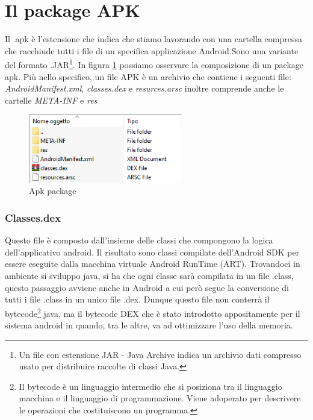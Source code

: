 \section{Il package APK}
\label{sub:apk}
Il .apk è l'estensione che indica che stiamo lavorando con una cartella compressa che racchiude tutti i file di un specifica applicazione Android.Sono una variante del formato .JAR\footnote{Un file con estensione JAR - Java Archive indica un archivio dati compresso usato per distribuire raccolte di classi Java.}. In figura \ref{fig:apkPack} possiamo osservare la composizione di un package apk. Più nello specifico, un file APK è un archivio che contiene i seguenti file: 
\textit{AndroidManifest.xml}, \textit{classes.dex} e \textit{resurces.arsc} inoltre comprende anche le cartelle \textit{META-INF} e \textit{res}
        \begin{figure}[h]
        \centering
        \includegraphics[width=0.6\textwidth]{imgs/capitolo2/Applicazioni/apk ins.png}
        \caption{Apk package}
        \label{fig:apkPack}
        \end{figure}
    \FloatBarrier %
\subsubsection{Classes.dex}    
Questo file è composto dall'insieme delle classi che compongono la logica dell'applicativo android. Il risultato sono classi compilate dell'Android SDK per essere eseguite dalla macchina virtuale Android RunTime (ART). Trovandoci in ambiente si sviluppo java, si ha che ogni classe sarà compilata in un file .class, questo passaggio avviene anche in Android a cui però segue la conversione di tutti i file .class in un unico file .dex. Dunque questo file non conterrà il bytecode\footnote{Il bytecode è un linguaggio intermedio che si posiziona tra il linguaggio macchina e il linguaggio di programmazione. Viene adoperato per descrivere le operazioni che costituiscono un programma.} java, ma il bytecode DEX che è stato introdotto appositamente per il sistema android in quando, tra le altre, va ad ottimizzare l'uso della memoria.

